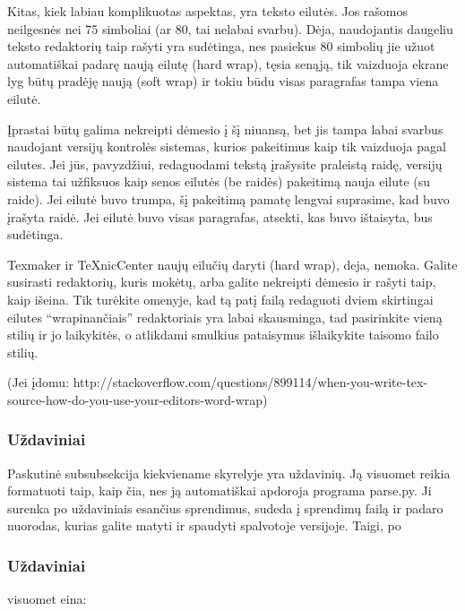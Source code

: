 Kitas, kiek labiau komplikuotas aspektas, yra teksto eilutės. Jos rašomos
neilgesnės nei 75 simboliai (ar 80, tai nelabai svarbu). Dėja, naudojantis
daugeliu teksto redaktorių taip rašyti yra sudėtinga, nes pasiekus 80
simbolių jie užuot automatiškai padarę naują eilutę (hard wrap), tęsia
senąją, tik vaizduoja ekrane lyg būtų pradėję naują (soft wrap) ir tokiu
būdu visas paragrafas tampa viena eilutė.  

Įprastai būtų galima nekreipti dėmesio į šį niuansą, bet jis tampa labai
svarbus naudojant versijų kontrolės sistemas, kurios pakeitimus kaip tik
vaizduoja pagal eilutes. Jei jūs, pavyzdžiui, redaguodami tekstą įrašysite
praleistą raidę, versijų sistema tai užfiksuos kaip senos eilutės (be
raidės) pakeitimą nauja eilute (su raide). Jei eilutė buvo trumpa, šį
pakeitimą pamatę lengvai suprasime, kad buvo įrašyta raidė. Jei eilutė buvo
visas paragrafas, atsekti, kas buvo ištaisyta, bus sudėtinga.

Texmaker ir TeXnicCenter naujų eilučių daryti (hard wrap), deja, nemoka.
Galite susirasti redaktorių, kuris mokėtų, arba galite nekreipti dėmesio ir
rašyti taip, kaip išeina. Tik turėkite omenyje, kad tą patį failą redaguoti
dviem skirtingai eilutes ``wrapinančiais'' redaktoriais yra labai
skausminga, tad pasirinkite vieną stilių ir jo laikykitės, o atlikdami
smulkius pataisymus išlaikykite taisomo failo stilių.  

(Jei įdomu:
http://stackoverflow.com/questions/899114/when-you-write-tex-source-how-do-you-use-your-editors-word-wrap)

\subsubsection{Uždaviniai}

Paskutinė subsubsekcija kiekviename skyrelyje yra uždavinių. Ją visuomet
reikia formatuoti taip, kaip čia, nes ją automatiškai apdoroja programa
parse.py. Ji surenka po uždaviniais esančius sprendimus, sudeda į sprendimų
failą ir padaro nuorodas, kurias galite matyti ir spaudyti spalvotoje
versijoje. Taigi, po \subsubsection{Uždaviniai} visuomet eina:

